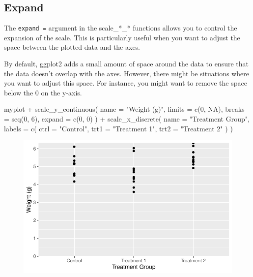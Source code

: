 \documentclass[
  letterpaper,
  DIV=11,
  numbers=noendperiod]{scrartcl}
\newenvironment{Shaded}{\begin{snugshade}}{\end{snugshade}}
\newcommand{\AttributeTok}[1]{\textcolor[rgb]{0.40,0.45,0.13}{#1}}
\newcommand{\ConstantTok}[1]{\textcolor[rgb]{0.56,0.35,0.01}{#1}}
\newcommand{\DecValTok}[1]{\textcolor[rgb]{0.68,0.00,0.00}{#1}}
\newcommand{\FunctionTok}[1]{\textcolor[rgb]{0.28,0.35,0.67}{#1}}
\newcommand{\NormalTok}[1]{\textcolor[rgb]{0.00,0.23,0.31}{#1}}
\newcommand{\SpecialCharTok}[1]{\textcolor[rgb]{0.37,0.37,0.37}{#1}}
\newcommand{\StringTok}[1]{\textcolor[rgb]{0.13,0.47,0.30}{#1}}
\begin{document}
\hypertarget{expand}{%
\subsection{Expand}\label{expand}}

The \texttt{expand\ =} argument in the scale\_*\_* functions allows you
to control the expansion of the scale. This is particularly useful when
you want to adjust the space between the plotted data and the axes.

By default, ggplot2 adds a small amount of space around the data to
ensure that the data doesn't overlap with the axes. However, there might
be situations where you want to adjust this space. For instance, you
might want to remove the space below the 0 on the y-axis.

\begin{Shaded}
\begin{Highlighting}[]
\NormalTok{myplot }\SpecialCharTok{+}
  \FunctionTok{scale\_y\_continuous}\NormalTok{(}
    \AttributeTok{name =} \StringTok{"Weight (g)"}\NormalTok{,}
    \AttributeTok{limits =} \FunctionTok{c}\NormalTok{(}\DecValTok{0}\NormalTok{, }\ConstantTok{NA}\NormalTok{),}
    \AttributeTok{breaks =} \FunctionTok{seq}\NormalTok{(}\DecValTok{0}\NormalTok{, }\DecValTok{6}\NormalTok{),}
    \AttributeTok{expand =} \FunctionTok{c}\NormalTok{(}\DecValTok{0}\NormalTok{, }\DecValTok{0}\NormalTok{)}
\NormalTok{  ) }\SpecialCharTok{+}
  \FunctionTok{scale\_x\_discrete}\NormalTok{(}
    \AttributeTok{name =} \StringTok{"Treatment Group"}\NormalTok{,}
    \AttributeTok{labels =} \FunctionTok{c}\NormalTok{(}
      \AttributeTok{ctrl =} \StringTok{"Control"}\NormalTok{, }
      \AttributeTok{trt1 =} \StringTok{"Treatment 1"}\NormalTok{, }
      \AttributeTok{trt2 =} \StringTok{"Treatment 2"}
\NormalTok{    )}
\NormalTok{  )}
\end{Highlighting}
\end{Shaded}

\begin{figure}[H]

{\centering \includegraphics{ggplot2intro_files/figure-pdf/unnamed-chunk-14-1.pdf}

}

\end{figure}
\end{document}

